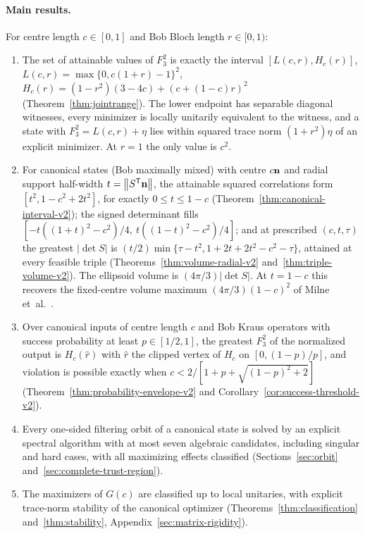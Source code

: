\documentclass[11pt,a4paper]{article}
\theoremstyle{remark}\newtheorem{remark}[theorem]{Remark}
\newcommand{\norm}[1]{\left\lVert#1\right\rVert}
\begin{document}
\paragraph{Main results.} For centre length $c\in[0,1]$ and Bob Bloch
length $r\in[0,1)$:
\begin{enumerate}
\item The set of attainable values of $F_3^2$ is exactly the interval
$[L(c,r),H_c(r)]$, $L(c,r)=\max\{0,c(1+r)-1\}^2$,
$H_c(r)=(1-r^2)(3-4c)+(c+(1-c)r)^2$ (Theorem~\ref{thm:jointrange}).
The lower endpoint has separable diagonal witnesses, every minimizer is
locally unitarily equivalent to the witness, and a state with
$F_3^2=L(c,r)+\eta$ lies within squared trace norm $(1+r^2)\eta$ of an
explicit minimizer. At $r=1$ the only value is $c^2$.
\item For canonical states (Bob maximally mixed) with centre $c\mathbf n$ and
radial support half-width $t=\norm{S^{\mathsf T}\nn}$, the attainable
squared correlations form $[t^2,1-c^2+2t^2]$, for exactly
$0\leq t\leq 1-c$ (Theorem~\ref{thm:canonical-interval-v2}); the signed
determinant fills $[-t((1+t)^2-c^2)/4,\ t((1-t)^2-c^2)/4]$; and at
prescribed $(c,t,\tau)$ the greatest $|\det S|$ is
$(t/2)\min\{\tau-t^2,1+2t+2t^2-c^2-\tau\}$, attained at every feasible
triple (Theorems~\ref{thm:volume-radial-v2} and~\ref{thm:triple-volume-v2}).
The ellipsoid volume is $(4\pi/3)|\det S|$. At $t=1-c$ this recovers the
fixed-centre volume maximum $(4\pi/3)(1-c)^2$ of Milne
et~al.~\cite{milnevolume}.
\item Over canonical inputs of centre length $c$ and Bob Kraus operators
with success probability at least $p\in[1/2,1]$, the greatest $F_3^2$ of
the normalized output is $H_c(\widehat r)$ with $\widehat r$ the clipped
vertex of $H_c$ on $[0,(1-p)/p]$, and violation is possible exactly when
$c<2/[1+p+\sqrt{(1-p)^2+2}]$ (Theorem~\ref{thm:probability-envelope-v2}
and Corollary~\ref{cor:success-threshold-v2}).
\item Every one-sided filtering orbit of a canonical state is solved by an
explicit spectral algorithm with at most seven algebraic candidates,
including singular and hard cases, with all maximizing effects classified
(Sections~\ref{sec:orbit} and~\ref{sec:complete-trust-region}).
\item The maximizers of $G(c)$ are classified up to local unitaries, with
explicit trace-norm stability of the canonical optimizer
(Theorems~\ref{thm:classification} and~\ref{thm:stability},
Appendix~\ref{sec:matrix-rigidity}).
\end{enumerate}
\end{document}
